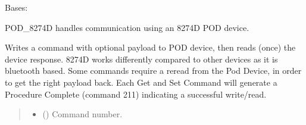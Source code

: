 \documentclass[letterpaper,10pt,english]{sphinxmanual}
\begin{document}
\begin{fulllineitems}
\label{\detokenize{PodApi.Devices:PodApi.Devices.PodDevice_8274D.Pod8274D}}
\pysigstartsignatures
{}
\pysigstopsignatures
\sphinxAtStartPar
Bases: {\hyperref[\detokenize{PodApi.Devices:PodApi.Devices.BasicPodProtocol.Pod}]{}}

\sphinxAtStartPar
POD\_8274D handles communication using an 8274D POD device.

\begin{fulllineitems}
\label{\detokenize{PodApi.Devices:PodApi.Devices.PodDevice_8274D.Pod8274D.WriteRead}}
\pysigstartsignatures
{}
\pysigstopsignatures
\sphinxAtStartPar
Writes a command with optional payload to POD device, then reads (once) the device response.
8274D works differently compared to other devices as it is bluetooth based. Some commands require a re\sphinxhyphen{}read from the
Pod Device, in order to get the right payload back. Each Get and Set Command will generate a Procedure Complete (command 211) indicating a successful write/read.
\begin{quote}\begin{description}
\begin{itemize}
\item {} 
\sphinxAtStartPar
{} (\sphinxstyleliteralemphasis{\sphinxupquote{ | }}) \textendash{} Command number.


\end{itemize}
\end{description}
\end{quote}
\end{fulllineitems}
\end{fulllineitems}
\end{document}

